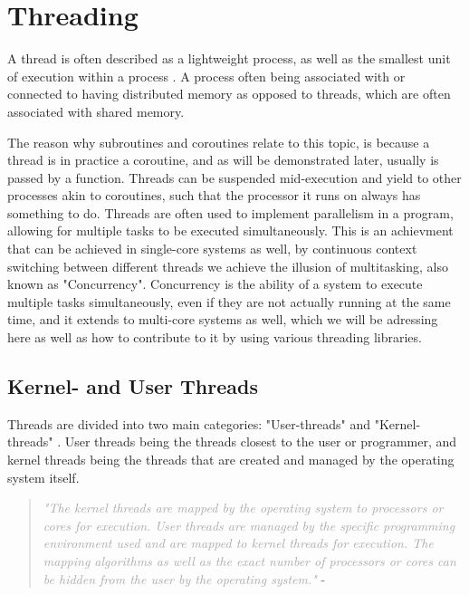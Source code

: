 \documentclass[12pt,a4paper]{article}
\begin{document}
\section{Threading}

A thread is often described as a lightweight process, as well as the smallest unit of execution within a process \parencite{Rauber2023}. A process often being associated with or connected to having distributed memory\parencite[p. 4, 27]{Rauber2023} as opposed to threads, which are often associated with shared memory. 

The reason why subroutines and coroutines relate to this topic, is because a thread is in practice a coroutine, and as will be demonstrated later, usually is passed by a function. Threads can be suspended mid-execution and yield to other processes akin to coroutines, such that the processor it runs on always has something to do. Threads are often used to implement parallelism in a program\parencite[p. 27]{Rauber2023}, allowing for multiple tasks to be executed simultaneously. This is an achievment that can be achieved in single-core systems as well, by continuous context switching between different threads\parencite{Rauber2023} we achieve the illusion of multitasking, also known as "Concurrency". Concurrency is the ability of a system to execute multiple tasks simultaneously, even if they are not actually running at the same time, and it extends to multi-core systems as well, which we will be adressing here as well as how to contribute to it by using various threading libraries.

\subsection{Kernel- and User Threads}

Threads are divided into two main categories: "User-threads" and "Kernel-threads" \parencite[p. 27]{Rauber2023}. User threads being the threads closest to the user or programmer, and kernel threads being the threads that are created and managed by the operating system itself.

\begin{quote}
    \textit{\textcolor{darkgray}{"The kernel threads are mapped by the operating system to processors or cores for execution. User threads are managed by the specific programming environment used and are mapped to kernel threads for execution. The mapping algorithms as well as the exact number of processors or cores can be hidden from the user by the operating system."}} - \parencite[p. 27]{Rauber2023}
\end{quote}
\end{document}
